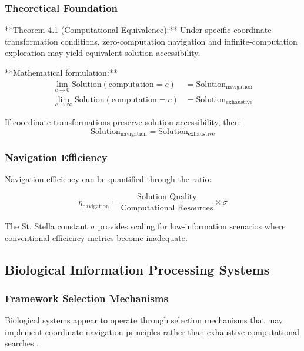 \documentclass[12pt,a4paper]{article}
\begin{document}
\subsubsection{Theoretical Foundation}

**Theorem 4.1 (Computational Equivalence):** Under specific coordinate transformation conditions, zero-computation navigation and infinite-computation exploration may yield equivalent solution accessibility.

**Mathematical formulation:**
\begin{align}
\lim_{c \to 0} \text{Solution}(\text{computation} = c) &= \text{Solution}_{\text{navigation}} \\
\lim_{c \to \infty} \text{Solution}(\text{computation} = c) &= \text{Solution}_{\text{exhaustive}}
\label{eq:computational_equivalence}
\end{align}

If coordinate transformations preserve solution accessibility, then:
\begin{equation}
\text{Solution}_{\text{navigation}} = \text{Solution}_{\text{exhaustive}}
\label{eq:navigation_exhaustive_equivalence}
\end{equation}

\subsubsection{Navigation Efficiency}

Navigation efficiency can be quantified through the ratio:

\begin{equation}
\eta_{\text{navigation}} = \frac{\text{Solution Quality}}{\text{Computational Resources}} \times \sigma
\label{eq:navigation_efficiency}
\end{equation}

The St. Stella constant $\sigma$ provides scaling for low-information scenarios where conventional efficiency metrics become inadequate.

\subsection{Biological Information Processing Systems}

\subsubsection{Framework Selection Mechanisms}

Biological systems appear to operate through selection mechanisms that may implement coordinate navigation principles rather than exhaustive computational searches \cite{friston2010free, clark2013whatever}.
\end{document}
